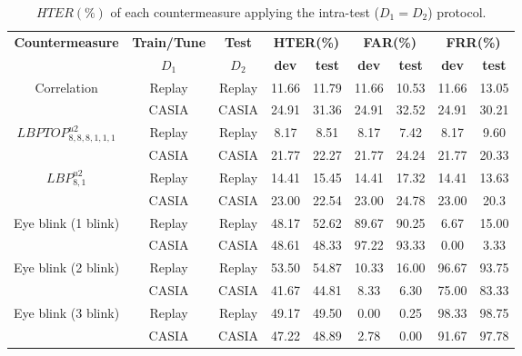 \hspace{-17mm}\begin{table}[ht!]
\caption{$HTER(\%)$ of each countermeasure applying the intra-test ($D_1=D_2$) protocol.}
\begin{center}
  \begin{tabular}{ | c | c | c | c  c | c  c  | c  c |}
    \hline

   \multirow{2}{*}{\textbf{Countermeasure}} & \textbf{Train/Tune} & \textbf{Test} & \multicolumn{2}{c|}{\textbf{HTER(\%)}} & \multicolumn{2}{c|}{\textbf{FAR(\%)}} & \multicolumn{2}{c|}{\textbf{FRR(\%)}} \\ 
     & $D_1$ & $D_2$ & \textbf{dev} & \textbf{test} & \textbf{dev} & \textbf{test} & \textbf{dev} & \textbf{test}  \\ \hline
    
    \multirow{2}{*}{Correlation} & Replay  & Replay  &  11.66 & 11.79  & 11.66 &  10.53 & 11.66  & 13.05\\ 
               & CASIA &  CASIA  & 24.91 & 31.36 & 24.91 & 32.52 & 24.91 & 30.21\\ \hline \hline

    \multirow{2}{*}{$LBPTOP_{8,8,8,1,1,1}^{u2}$}  & Replay & Replay  & 8.17 & 8.51  & 8.17& 7.42 & 8.17 & 9.60\\
               & CASIA  & CASIA  & 21.77 & 22.27 & 21.77& 24.24 & 21.77 & 20.33\\ \hline \hline

    \multirow{2}{*}{$LBP_{8,1}^{u2}$} & Replay  & Replay  & 14.41 &15.45 & 14.41 & 17.32 & 14.41 & 13.63 \\
               & CASIA  & CASIA  & 23.00  & 22.54 & 23.00 & 24.78 & 23.00 & 20.3\\ \hline \hline
            
    \multirow{2}{*}{Eye blink (1 blink)} & Replay  & Replay  & 48.17 & 52.62 & 89.67 & 90.25 & 6.67 & 15.00\\
               & CASIA  & CASIA  & 48.61 &48.33 & 97.22 & 93.33 & 0.00 & 3.33 \\ \hline \hline

    \multirow{2}{*}{Eye blink (2 blink)} & Replay  & Replay  & 53.50 & 54.87 & 10.33 & 16.00 & 96.67 & 93.75\\
               & CASIA  & CASIA  & 41.67 & 44.81 & 8.33 & 6.30 & 75.00 & 83.33 \\ \hline \hline

    \multirow{2}{*}{Eye blink (3 blink)} & Replay  & Replay  & 49.17 & 49.50 & 0.00 & 0.25& 98.33 & 98.75\\
               & CASIA  & CASIA  & 47.22  & 48.89 & 2.78 & 0.00 & 91.67 & 97.78\\
    \hline
  \end{tabular}
\end{center}
\label{tb:IntraTest}
\end{table}


